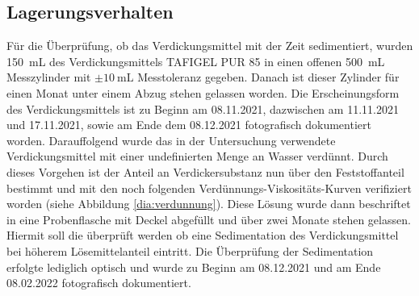 \subsection{Lagerungsverhalten}
Für die Überprüfung, ob das Verdickungsmittel mit der Zeit sedimentiert, wurden \SI{150}{\milli \liter} des Verdickungsmittels TAFIGEL PUR 85 in einen offenen \SI{500}{\milli \liter} Messzylinder mit $\pm \SI{10}{\milli \liter}$ Messtoleranz gegeben. Danach ist dieser Zylinder für einen Monat unter einem Abzug stehen gelassen worden. Die Erscheinungsform des Verdickungsmittels ist zu Beginn am 08.11.2021, dazwischen am 11.11.2021 und 17.11.2021, sowie am Ende dem 08.12.2021 fotografisch dokumentiert worden.\linebreak
Darauffolgend wurde das in der Untersuchung verwendete Verdickungsmittel mit einer undefinierten Menge an Wasser verdünnt. Durch dieses Vorgehen ist der Anteil an Verdickersubstanz nun über den Feststoffanteil bestimmt und mit den noch folgenden Verdünnungs-Viskositäts-Kurven verifiziert worden (siehe Abbildung \ref{dia:verdunnung}). Diese Lösung wurde dann beschriftet in eine Probenflasche mit Deckel abgefüllt und über zwei Monate stehen gelassen. Hiermit soll die überprüft werden ob eine Sedimentation des Verdickungsmittel bei höherem Lösemittelanteil eintritt. Die Überprüfung der Sedimentation erfolgte lediglich optisch und wurde zu Beginn am 08.12.2021 und am Ende 08.02.2022 fotografisch dokumentiert.

